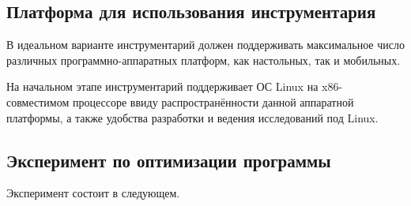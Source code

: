 \subsection{Платформа для использования инструментария}
В идеальном варианте инструментарий должен поддерживать максимальное число различных программно-аппаратных платформ, как настольных, так и мобильных.

На начальном этапе инструментарий поддерживает ОС Linux на x86-совместимом процессоре ввиду распространённости данной аппаратной платформы, а также удобства разработки и ведения исследований под Linux.


\subsection{Эксперимент по оптимизации программы}
Эксперимент состоит в следующем.

